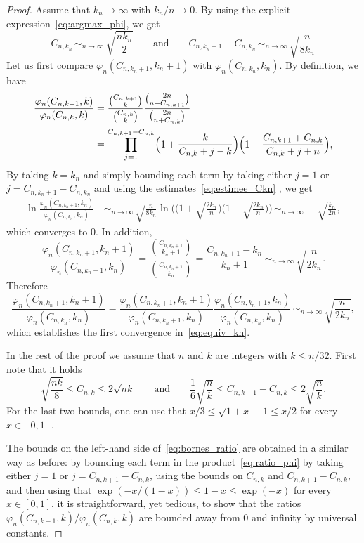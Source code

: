 \documentclass[11pt]{article}
\theoremstyle{plain}
\theoremstyle{definition}
\theoremstyle{remark}
\newcommand{\equi}[1][n]{\,\mathop{\sim}^{}_{#1 \to \infty}\,}
\begin{document}
\begin{proof}
Assume that $k_n\to\infty$ with $k_n/n\to0$. By using the explicit expression~\eqref{eq:argmax_phi}, we get
\begin{equation}\label{eq:estimee_Ckn}
C_{n,k_n} \equi \sqrt{\frac{n k_n}{2}}
\qquad\text{and}\qquad
C_{n,k_n+1} - C_{n,k_n} \equi \sqrt{\frac{n}{8 k_n }}
\end{equation}
Let us first compare $\varphi_{n}(C_{n,k_{n}+1},k_{n}+1)$ with $\varphi_{n}(C_{n,k_{n}},k_{n})$. By definition, we have
\begin{equation}\label{eq:ratio_phi}
\begin{split}
\frac{\varphi_{n}(C_{n,k+1},k)}{\varphi_{n}(C_{n,k},k)}
&= \frac{\binom{C_{n,k+1}}{k}}{\binom{C_{n,k}}{k}} \frac{\binom{2n}{n+C_{n,k+1}}}{\binom{2n}{n+C_{n,k}}}\\
&= \prod_{j=1}^{C_{n,k+1}-C_{n,k}} \Bigl(1+\frac{k}{C_{n,k}+j-k} \Bigr) \Bigl(1- \frac{C_{n,k+1}+C_{n,k}}{C_{n,k}+j+n}\Bigr),
\end{split}
\end{equation}
By taking $k=k_{n}$ and simply bounding each term by taking either $j=1$ or $j=C_{n,k_{n}+1}-C_{n,k_{n}}$ and using the estimates~\eqref{eq:estimee_Ckn} , we get
\begin{align*}
\ln \frac{\varphi_{n}(C_{n,k_n+1},k_n)}{\varphi_{n}(C_{n,k_n},k_n)}
&\equi \sqrt{\frac{n}{8k_n}} \ln\biggl(\biggl(1+\sqrt{\frac{2k_n}{n}}\biggr) \biggl(1-\sqrt{\frac{2k_n}{n}}\biggr)\biggr)
\equi - \sqrt{\frac{k_n}{2n}},
\end{align*}
which converges to $0$. In addition,
\[
\frac{\varphi_{n}(C_{n,k_n+1},k_n+1)}{\varphi_{n}(C_{n,k_n+1},k_n)}
= \frac{\binom{C_{n,k_n+1}}{k_n+1}}{\binom{C_{n,k_n+1}}{k_n}}
= \frac{C_{n,k_n+1} - k_n}{k_n+1}
\equi \sqrt{\frac{n}{2k_n}}.
\]
Therefore
\[
\frac{\varphi_{n}(C_{n,k_n+1},k_n+1)}{\varphi_{n}(C_{n,k_n},k_n)}
= \frac{\varphi_{n}(C_{n,k_n+1},k_n+1)}{\varphi_{n}(C_{n,k_n+1},k_n)} \frac{\varphi_{n}(C_{n,k_n+1},k_n)}{\varphi_{n}(C_{n,k_n},k_n)}
\equi \sqrt{\frac{n}{2k_n}},
\]
which establishes the first convergence in~\eqref{eq:equiv_kn}.

In the rest of the proof we assume that $n$ and $k$ are integers with $k \le n/32$. First note that it holds
\[
\sqrt{\frac{n k}{8}}
\le C_{n,k}
\le 2 \sqrt{n k}
\qquad\text{and}\qquad
\frac{1}{6} \sqrt{\frac{n}{k}} \le C_{n,k+1} - C_{n,k} \le 2 \sqrt{\frac{n}{k}}.
\]
For the last two bounds, one can use that $x/3 \le \sqrt{1+x} - 1 \le x/2$ for every $x \in[0,1]$.

The bounds on the left-hand side of~\eqref{eq:bornes_ratio} are obtained in a similar way as before: by bounding each term in the product~\eqref{eq:ratio_phi} by taking either $j=1$ or $j=C_{n,k+1}-C_{n,k}$, using the bounds on $C_{n,k}$ and $C_{n,k+1}-C_{n,k}$, and then using that $\exp(-x/(1-x)) \le 1-x \le \exp(-x)$ for every $x \in [0,1]$, it is straightforward, yet tedious, to show that the ratios
$\varphi_{n}(C_{n,k+1},k)/\varphi_{n}(C_{n,k},k)$
are bounded away from $0$ and infinity by universal constants.


\end{proof}
\end{document}
